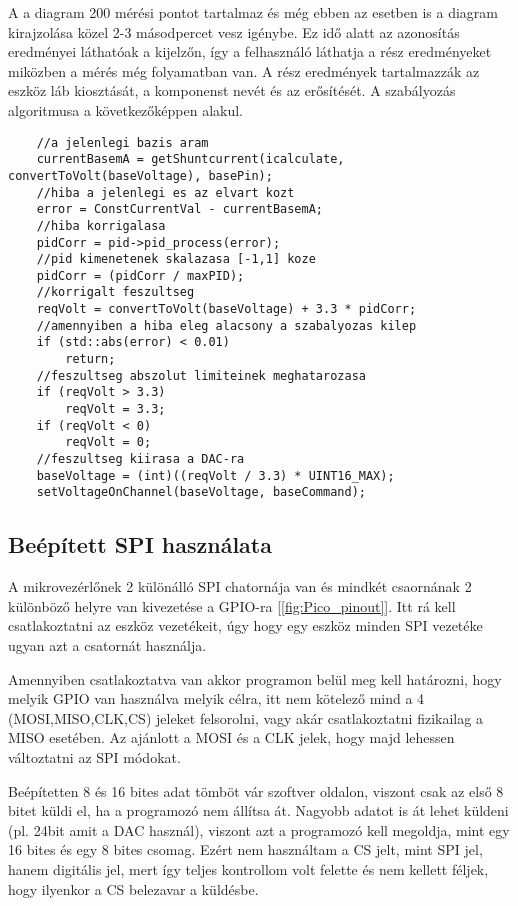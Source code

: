 A a diagram 200 mérési pontot tartalmaz és még ebben az esetben is a 
diagram kirajzolása közel 2-3 másodpercet vesz igénybe. Ez idő alatt 
az azonosítás eredményei láthatóak a kijelzőn, így a felhasználó láthatja
a rész eredményeket miközben a mérés még folyamatban van. 
A rész eredmények tartalmazzák az eszköz láb kiosztását, a komponenst
nevét és az erősítését. A szabályozás algoritmusa a következőképpen
alakul.

\begin{lstlisting}
    //a jelenlegi bazis aram
    currentBasemA = getShuntcurrent(icalculate, convertToVolt(baseVoltage), basePin);
    //hiba a jelenlegi es az elvart kozt
    error = ConstCurrentVal - currentBasemA;
    //hiba korrigalasa
    pidCorr = pid->pid_process(error);
    //pid kimenetenek skalazasa [-1,1] koze
    pidCorr = (pidCorr / maxPID);
    //korrigalt feszultseg
    reqVolt = convertToVolt(baseVoltage) + 3.3 * pidCorr;
    //amennyiben a hiba eleg alacsony a szabalyozas kilep
    if (std::abs(error) < 0.01)
        return;
    //feszultseg abszolut limiteinek meghatarozasa    
    if (reqVolt > 3.3)
        reqVolt = 3.3;
    if (reqVolt < 0)
        reqVolt = 0;
    //feszultseg kiirasa a DAC-ra
    baseVoltage = (int)((reqVolt / 3.3) * UINT16_MAX);
    setVoltageOnChannel(baseVoltage, baseCommand);
\end{lstlisting}

\subsection{Beépített SPI használata}

A mikrovezérlőnek 2 különálló SPI chatornája van és mindkét csaornának 2 különböző
helyre van kivezetése a GPIO-ra [\ref{fig:Pico_pinout}]. Itt rá kell csatlakoztatni az eszköz vezetékeit, úgy
hogy egy eszköz minden SPI vezetéke ugyan azt a csatornát használja.

Amennyiben csatlakoztatva van akkor programon belül meg kell határozni, hogy 
melyik GPIO van használva melyik célra, itt nem kötelező mind a 4 (MOSI,MISO,CLK,CS)
jeleket felsorolni, vagy akár csatlakoztatni fizikailag a MISO esetében. Az 
ajánlott a MOSI és a CLK jelek, hogy majd lehessen változtatni az SPI módokat.

Beépítetten 8 és 16 bites adat tömböt vár szoftver oldalon, viszont csak az első
8 bitet küldi el, ha a programozó nem állítsa át. Nagyobb adatot is át lehet 
küldeni (pl. 24bit amit a DAC használ), viszont azt a programozó kell megoldja,
mint egy 16 bites és egy 8 bites csomag. Ezért nem használtam a CS jelt, mint 
SPI jel, hanem digitális jel, mert így teljes kontrollom volt felette és nem 
kellett féljek, hogy ilyenkor a CS belezavar a küldésbe.


